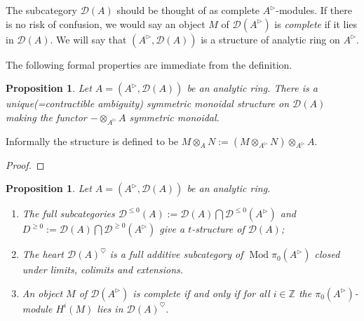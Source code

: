 \documentclass{article}
\theoremstyle{plain}
\newtheorem{prop}[thm]{Proposition}
\theoremstyle{definition}
\theoremstyle{remark}
\DeclareMathOperator{\modcat}{Mod}
\newcommand{\huflag}{\triangleright}
\newcommand{\D}{\mathcal{D}}
\newcommand{\heart}{\heartsuit}
\begin{document}
The subcategory $ \D (A) $ should be thought of as complete $ A ^{\huflag} $-modules.
If there is no risk of confusion, we would say an object $ M $ of $ \D (A ^{\huflag}) $ is \emph{complete} if it lies in $\D (A) $.
We will say that $ (A ^{\huflag}, \D (A)) $ is a structure of analytic ring on $ A ^{\huflag} $.

The following formal properties are immediate from the definition.
\begin{prop}
Let $ A = (A ^{\huflag}, \D (A)) $ be an analytic ring.
There is a unique(=contractible ambiguity) symmetric monoidal structure on $ \D (A) $ making the functor $ -\otimes _{A ^{\huflag}} A $ symmetric monoidal.
\end{prop}

Informally the structure is defined to be $ M \otimes _{A} N := (M \otimes _{A ^{\huflag}} N)\otimes _{A ^{\huflag}} A $.

\begin{proof}

\end{proof}

\begin{prop}
Let $ A = (A ^{\huflag}, \D (A)) $ be an analytic ring.
\begin{enumerate}
\item The full subcategories $ \D ^{\leq 0}(A) := \D (A) \bigcap \D ^{\leq 0}(A ^{\huflag}) $ and $ D ^{\geq 0} := \D (A) \bigcap \D ^{\geq 0} (A ^{\huflag}) $
give a $ t $-structure of $ \D (A) $;
\item The heart $ \D (A)^{\heart} $ is a full additive subcategory of $ \modcat{\pi _{0}(A ^{\huflag})} $ closed under limits, colimits
and extensions.
\item An object $ M $ of $ \D (A ^{\huflag}) $ is complete if and only if for all $ i\in \mathbb{Z} $ the $ \pi _{0}(A ^{\huflag}) $-module
$ H ^{i}(M) $ lies in $ \D (A)^{\heart} $.
\end{enumerate}
\end{prop}
\end{document}
